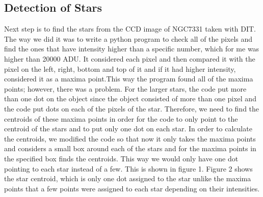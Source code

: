 \documentclass[letterpaper,12pt]{article}
\begin{document}
\subsection{Detection of Stars}
Next step is to find the stars from the CCD image of NGC7331 taken with DIT. The way we did it was to write a python program to check all of the pixels and find the ones that have intensity higher than a specific number, which for me was higher than 20000 ADU. It considered each pixel and then compared it with the pixel on the left, right, bottom and top of it and if it had higher intensity, considered it as a maxima point.This way the program found all of the maxima points; however, there was a problem. For the larger stars, the code put more than one dot on the object since the object consisted of more than one pixel and the code put dots on each of the pixels of the star. Therefore, we need to find the centroids of these maxima points in order for the code to only point to the centroid of the stars and to put only one dot on each star. In order to calculate the centroids, we modified the code so that now it only takes the maxima points and considers a small box around each of the stars and for the maxima points in the specified box finds the centroids. This way we would only have one dot pointing to each star instead of a few. This is shown in figure 1. Figure 2 shows the star centroid, which is only one dot assigned to the star unlike the maxima points that a few points were assigned to each star depending on their intensities.
\end{document}
